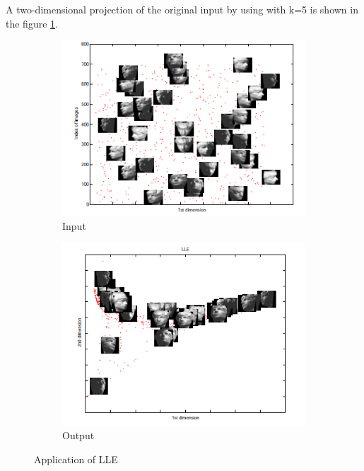 A two-dimensional projection of the original input by using with k=5 is shown in the figure \ref{app_lle}.
\begin{figure}
\centering
\begin{subfigure}{.5\textwidth}
  \centering
  \includegraphics[width=\linewidth]{./Figures/original.png}
\caption{Input}
\end{subfigure}%
\begin{subfigure}{.5\textwidth}
  \centering
  \includegraphics[width=\linewidth]{./Figures/o_lle.png}
  \caption{Output}
\end{subfigure}
\caption{Application of LLE}
\label{app_lle}
\end{figure}

